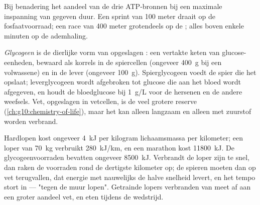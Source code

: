 \begin{omfigure}

{\small Bij benadering het aandeel van de drie ATP-bronnen bij een
maximale inspanning van gegeven duur. Een sprint van 100 meter draait op
de fosfaatvoorraad; een race van 400 meter grotendeels op de ;
alles boven enkele minuten op de ademhaling.}
\end{omfigure}

\begin{definition}[Glycogeen]\label{def:g10:exercise-and-energy:glycogen}
\emph{Glycogeen} is de dierlijke vorm van opgeslagen
: een vertakte keten van glucose-eenheden, bewaard als
korrels in de spiercellen (ongeveer \qty{400}{g} bij een volwassene) en
in de lever (ongeveer \qty{100}{g}). Spierglycogeen voedt de spier die
het opslaat; leverglycogeen wordt afgebroken tot glucose die aan het
bloed wordt afgegeven, en houdt de bloedglucose bij \qty{1}{g/L} voor de
hersenen en de andere weefsels. Vet, opgeslagen in vetcellen, is de veel
grotere reserve (\cref{ch:g10:chemistry-of-life}), maar het kan alleen
langzaam en alleen met zuurstof worden verbrand.
\end{definition}

\begin{example}\label{ex:g10:exercise-and-energy:wall}
Hardlopen kost ongeveer \qty{4}{kJ} per kilogram lichaamsmassa per
kilometer; een loper van \qty{70}{kg} verbruikt \qty{280}{kJ/km}, en een
marathon kost \qty{11800}{kJ}. De glycogeenvoorraden bevatten ongeveer
\qty{8500}{kJ}. Verbrandt de loper zijn  te snel, dan raken de
voorraden rond de dertigste kilometer op; de spieren moeten dan op vet
terugvallen, dat energie met nauwelijks de halve snelheid levert, en het
tempo stort in --- "tegen de muur lopen". Getrainde lopers verbranden
van meet af aan een groter aandeel vet, en eten  tijdens de
wedstrijd.
\end{example}

